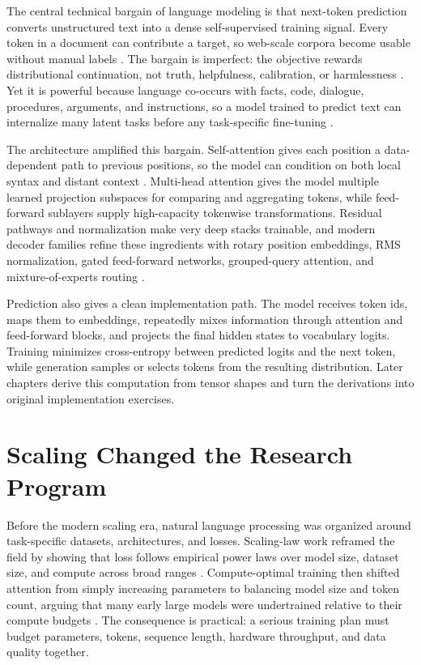 The central technical bargain of language modeling is that next-token prediction converts unstructured text into a dense self-supervised training signal. Every token in a document can contribute a target, so web-scale corpora become usable without manual labels \cite{brown2020language}. The bargain is imperfect: the objective rewards distributional continuation, not truth, helpfulness, calibration, or harmlessness \cite{ouyang2022training}. Yet it is powerful because language co-occurs with facts, code, dialogue, procedures, arguments, and instructions, so a model trained to predict text can internalize many latent tasks before any task-specific fine-tuning \cite{brown2020language}.

The \transformer architecture amplified this bargain. Self-attention gives each position a data-dependent path to previous positions, so the model can condition on both local syntax and distant context \cite{vaswani2017attention}. Multi-head attention gives the model multiple learned projection subspaces for comparing and aggregating tokens, while feed-forward sublayers supply high-capacity tokenwise transformations. Residual pathways and normalization make very deep stacks trainable, and modern decoder families refine these ingredients with rotary position embeddings, RMS normalization, gated feed-forward networks, grouped-query attention, and mixture-of-experts routing \cite{su2021roformer,touvron2023llama,ainslie2023gqa,deepseek2024v3}.

Prediction also gives a clean implementation path. The model receives token ids, maps them to embeddings, repeatedly mixes information through attention and feed-forward blocks, and projects the final hidden states to vocabulary logits. Training minimizes cross-entropy between predicted logits and the next token, while generation samples or selects tokens from the resulting distribution. Later chapters derive this computation from tensor shapes and turn the derivations into original implementation exercises.

\section{Scaling Changed the Research Program}
\label{sec:scaling-changed-program}

Before the modern scaling era, natural language processing was organized around task-specific datasets, architectures, and losses. Scaling-law work reframed the field by showing that loss follows empirical power laws over model size, dataset size, and compute across broad ranges \cite{kaplan2020scaling}. Compute-optimal training then shifted attention from simply increasing parameters to balancing model size and token count, arguing that many early large models were undertrained relative to their compute budgets \cite{hoffmann2022training}. The consequence is practical: a serious training plan must budget parameters, tokens, sequence length, hardware throughput, and data quality together.

